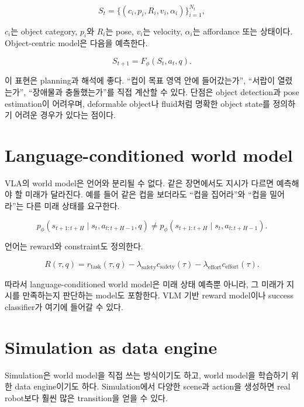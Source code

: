 \begin{equation}
  S_t =
  \{(c_i,p_i,R_i,v_i,\alpha_i)\}_{i=1}^{N_t},
\end{equation}

$c_i$는 object category, $p_i$와 $R_i$는 pose, $v_i$는 velocity, $\alpha_i$는 affordance 또는 상태이다. Object-centric model은 다음을 예측한다.

\begin{equation}
  S_{t+1}
  =
  F_\phi(S_t,a_t,q).
\end{equation}

이 표현은 planning과 해석에 좋다. ``컵이 목표 영역 안에 들어갔는가'', ``서랍이 열렸는가'', ``장애물과 충돌했는가''를 직접 계산할 수 있다. 단점은 object detection과 pose estimation이 어려우며, deformable object나 fluid처럼 명확한 object state를 정의하기 어려운 경우가 있다는 점이다.

\section{Language-conditioned world model}

VLA의 world model은 언어와 분리될 수 없다. 같은 장면에서도 지시가 다르면 예측해야 할 미래가 달라진다. 예를 들어 같은 컵을 보더라도 ``컵을 집어라''와 ``컵을 밀어라''는 다른 미래 상태를 요구한다.

\begin{equation}
  p_\phi(s_{t+1:t+H} \mid s_t,a_{t:t+H-1},q)
  \ne
  p_\phi(s_{t+1:t+H} \mid s_t,a_{t:t+H-1}).
\end{equation}

언어는 reward와 constraint도 정의한다.

\begin{equation}
  R(\tau,q)
  =
  r_{\mathrm{task}}(\tau,q)
  -
  \lambda_{\mathrm{safety}} c_{\mathrm{safety}}(\tau)
  -
  \lambda_{\mathrm{effort}} c_{\mathrm{effort}}(\tau).
\end{equation}

따라서 language-conditioned world model은 미래 상태 예측뿐 아니라, 그 미래가 지시를 만족하는지 판단하는 model도 포함한다. VLM 기반 reward model이나 success classifier가 여기에 들어갈 수 있다.

\section{Simulation as data engine}

Simulation은 world model을 직접 쓰는 방식이기도 하고, world model을 학습하기 위한 data engine이기도 하다. Simulation에서 다양한 scene과 action을 생성하면 real robot보다 훨씬 많은 transition을 얻을 수 있다.

